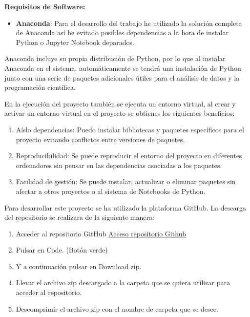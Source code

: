   
\textbf{Requisitos de Software:} 

  \begin{itemize}
   \tightlist
   \item
    \textbf{Anaconda}: Para el desarrollo del trabajo he utilizado la solución completa de Anaconda así he evitado posibles dependencias a la hora de instalar Python o Jupyter Notebook deparados.
  \end{itemize}
  

Anaconda incluye su propia distribución de Python, por lo que al instalar Anaconda en el sistema, automáticamente se tendrá una instalación de Python junto con una serie de paquetes adicionales útiles para el análisis de datos y la programación científica.

En la ejecución del proyecto también se ejecuta un entorno virtual, al crear y activar un entorno virtual en el proyecto se obtienes los siguientes beneficios:

\begin{enumerate}
\def\labelenumi{\arabic{enumi}.}
\tightlist
\item Aíslo dependencias: Puedo instalar bibliotecas y paquetes específicos para el proyecto evitando conflictos entre versiones de paquetes.

\item Reproducibilidad: Se puede reproducir el entorno del proyecto en diferentes ordenadores sin pensar en las dependencias asociadas a los paquetes.

\item Facilidad de gestión: Se puede instalar, actualizar o eliminar paquetes sin afectar a otros proyectos o al sistema de Notebooks de Python.

\end{enumerate}


Para desarrollar este proyecto se ha utilizado la plataforma GitHub.
La descarga del repositorio se realizara de la siguiente manera:

\begin{enumerate}
\def\labelenumi{\arabic{enumi}.}
\tightlist
\item Acceder al repositorio GitHub \href{https://github.com/jpg1003/GII_O_MA_23.37}{Acceso repositorio Github}
\item Pulsar en Code. (Botón verde)
\item Y a continuación pulsar en Download zip.


\item Llevar el archivo zip descargado a la carpeta que se quiera utilizar para acceder al repositorio.
\item Descomprimir el archivo zip con el nombre de carpeta que se desee.

\end{enumerate}

